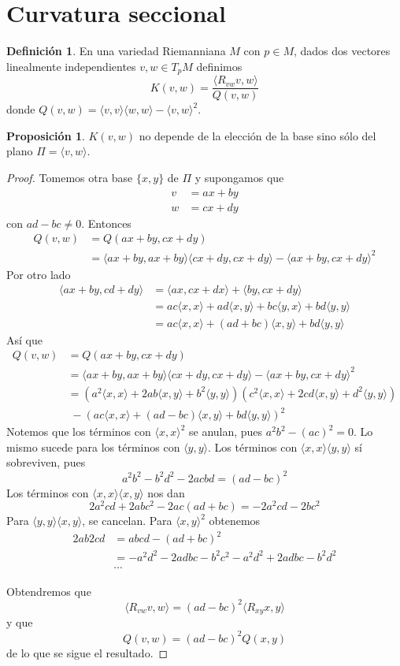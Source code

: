\documentclass[spanish]{book}
\theoremstyle{definition}
\newtheorem*{defn}{Definición}
\newtheorem*{prop}{Proposición}
\begin{document}
	\section{Curvatura seccional}
	\begin{defn}
		En una variedad Riemanniana $M$ con $p\in M$, dados dos vectores linealmente independientes $v,w\in T_pM$ definimos
		\[K(v,w)=\frac{\langle R_{vw}v,w\rangle}{Q(v,w)}\]
		donde $Q(v,w)=\langle v,v\rangle\langle w,w\rangle-\langle v,w\rangle^2$.
	\end{defn}
	\begin{prop}
		$K(v,w)$ no depende de la elección de la base sino sólo del plano $\Pi=\langle v,w\rangle$.
	\end{prop}
	\begin{proof}
		Tomemos otra base $\{x,y\}$ de $\Pi$ y supongamos que
		\begin{align*}
			v&=ax+by\\
			w&=cx+dy
		\end{align*}
		con $ad-bc\neq0$. Entonces
		\begin{align*}
			Q(v,w)&=Q(ax+by,cx+dy)\\
			&=\langle ax+by,ax+by\rangle\langle cx+dy, cx+dy\rangle-\langle ax+by,cx+dy\rangle^2
		\end{align*}
		Por otro lado
		\begin{align*}
			\langle ax+by,cd+dy\rangle&=\langle ax,cx+dx\rangle+\langle by,cx+dy\rangle\\
			&=ac\langle x,x\rangle+ad\langle x,y\rangle+bc\langle y,x\rangle+bd\langle y,y\rangle\\
			&=ac\langle x,x\rangle+(ad+bc)\langle x,y\rangle +bd\langle y,y\rangle
		\end{align*}
		Así que
			\begin{align*}
			Q(v,w)&=Q(ax+by,cx+dy)\\
			&=\langle ax+by,ax+by\rangle\langle cx+dy, cx+dy\rangle-\langle ax+by,cx+dy\rangle^2\\
			&=(a^2\langle x,x\rangle+2ab\langle x,y\rangle+b^2\langle y,y\rangle)(c^2\langle x,x\rangle+2cd\langle x,y\rangle+d^2\langle y,y\rangle)\\&\; -(ac\langle x,x\rangle+(ad-bc)\langle x,y\rangle+bd\langle y,y\rangle)^2
		\end{align*}
		Notemos que los términos con $\langle x,x\rangle^2$ se anulan, pues $a^2b^2-(ac)^2=0$. Lo mismo sucede para los términos con $\langle y,y\rangle$. Los términos con $\langle x,x\rangle\langle y,y\rangle$ sí sobreviven, pues
		\[a^2b^2-b^2d^2-2acbd=(ad-bc)^2\]
		Los términos con $\langle x,x\rangle\langle x,y\rangle$ nos dan
		\[2a^2cd+2abc^2-2ac(ad+bc)=-2a^2cd-2bc^2\]
		Para $\langle y,y\rangle\langle x,y\rangle$, se cancelan. Para $\langle x,y\rangle^2$ obtenemos
		\begin{align*}
			2ab2cd&=abcd-(ad+bc)^2\\
			&=-a^2d^2-2adbc-b^2c^2-a^2d^2+2adbc-b^2d^2\\
			&\cdots
		\end{align*}
		
		Obtendremos que
		\[\langle R_{vw}v,w\rangle=(ad-bc)^2\langle R_{xy}x,y\rangle\]
		y que
		\[Q(v,w)=(ad-bc)^2Q(x,y)\]
		de lo que se sigue el resultado.
	\end{proof}
\end{document}

